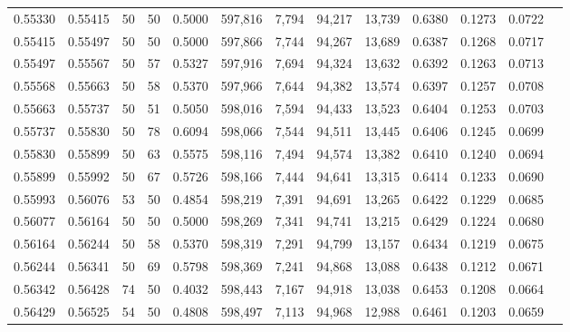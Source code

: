 \begin{tabular}{rrrrrrrrrrrrr}
0.55330 & 0.55415 &    50 &  50 &                                     0.5000 & 597,816 &   7,794 &  94,217 &  13,739 & 0.6380 & 0.1273 & 0.0722 \\
0.55415 & 0.55497 &    50 &  50 &                                     0.5000 & 597,866 &   7,744 &  94,267 &  13,689 & 0.6387 & 0.1268 & 0.0717 \\
0.55497 & 0.55567 &    50 &  57 &                                     0.5327 & 597,916 &   7,694 &  94,324 &  13,632 & 0.6392 & 0.1263 & 0.0713 \\
0.55568 & 0.55663 &    50 &  58 &                                     0.5370 & 597,966 &   7,644 &  94,382 &  13,574 & 0.6397 & 0.1257 & 0.0708 \\
0.55663 & 0.55737 &    50 &  51 &                                     0.5050 & 598,016 &   7,594 &  94,433 &  13,523 & 0.6404 & 0.1253 & 0.0703 \\
0.55737 & 0.55830 &    50 &  78 &                                     0.6094 & 598,066 &   7,544 &  94,511 &  13,445 & 0.6406 & 0.1245 & 0.0699 \\
0.55830 & 0.55899 &    50 &  63 &                                     0.5575 & 598,116 &   7,494 &  94,574 &  13,382 & 0.6410 & 0.1240 & 0.0694 \\
0.55899 & 0.55992 &    50 &  67 &                                     0.5726 & 598,166 &   7,444 &  94,641 &  13,315 & 0.6414 & 0.1233 & 0.0690 \\
0.55993 & 0.56076 &    53 &  50 &                                     0.4854 & 598,219 &   7,391 &  94,691 &  13,265 & 0.6422 & 0.1229 & 0.0685 \\
0.56077 & 0.56164 &    50 &  50 &                                     0.5000 & 598,269 &   7,341 &  94,741 &  13,215 & 0.6429 & 0.1224 & 0.0680 \\
0.56164 & 0.56244 &    50 &  58 &                                     0.5370 & 598,319 &   7,291 &  94,799 &  13,157 & 0.6434 & 0.1219 & 0.0675 \\
0.56244 & 0.56341 &    50 &  69 &                                     0.5798 & 598,369 &   7,241 &  94,868 &  13,088 & 0.6438 & 0.1212 & 0.0671 \\
0.56342 & 0.56428 &    74 &  50 &                                     0.4032 & 598,443 &   7,167 &  94,918 &  13,038 & 0.6453 & 0.1208 & 0.0664 \\
0.56429 & 0.56525 &    54 &  50 &                                     0.4808 & 598,497 &   7,113 &  94,968 &  12,988 & 0.6461 & 0.1203 & 0.0659 \\

\end{tabular}
